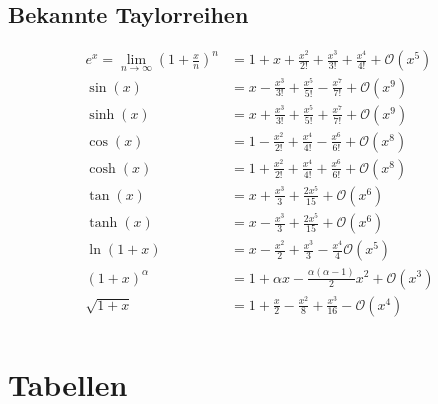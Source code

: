 \documentclass[a4paper,8pt]{extarticle}
\begin{document}
\subsection{Bekannte Taylorreihen}
\begin{align*}
  e^x = \lim_{n \to \infty} \left(1 + \frac{x}{n} \right)^n & = 1 + x + \frac{x^2}{2!} + \frac{x^3}{3!} + \frac{x^4}{4!} + \mathcal{O}(x^5) \\
  \sin(x) & = x - \frac{x^3}{3!} + \frac{x^5}{5!} - \frac{x^7}{7!} + \mathcal{O}(x^9) \\ 
  \sinh(x) & = x + \frac{x^3}{3!} + \frac{x^5}{5!} + \frac{x^7}{7!} + \mathcal{O}(x^9) \\ 
  \cos(x) & = 1 - \frac{x^2}{2!} + \frac{x^4}{4!} - \frac{x^6}{6!} + \mathcal{O}(x^8) \\  
  \cosh(x) & = 1 + \frac{x^2}{2!} + \frac{x^4}{4!} + \frac{x^6}{6!} + \mathcal{O}(x^8) \\  
  \tan(x) & = x + \frac{x^3}{3} + \frac{2x^5}{15} + \mathcal{O}(x^6) \\ 
  \tanh(x) & = x - \frac{x^3}{3} + \frac{2x^5}{15} + \mathcal{O}(x^6) \\ 
  \ln(1 + x) & = x - \frac{x^2}{2} + \frac{x^3}{3} - \frac{x^4}{4} \mathcal{O}(x^5) \\
  (1 + x)^\alpha & = 1 + \alpha x - \frac{\alpha (\alpha - 1)}{2}x^2 + \mathcal{O}(x^3) \\ 
  \sqrt{1 + x} & = 1 + \frac{x}{2} - \frac{x^2}{8} + \frac{x^3}{16} - \mathcal{O}(x^4) \\
\end{align*}


\section{Tabellen}
\def\limxpi{\lim_{x\to +\infty}}
\def\limxmi{\lim_{x\to -\infty}}
\def\limxi{\lim_{x\to \pm \infty}}
\end{document}
